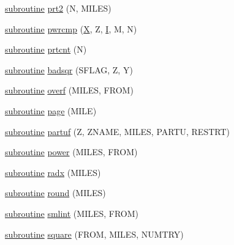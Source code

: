 \begin{DoxyCompactItemize}
\item 
\hyperlink{M__stopwatch_83_8txt_acfbcff50169d691ff02d4a123ed70482}{subroutine} \hyperlink{dparanoia_8f90_adb64903f8562ae9b54e1bc9688d73256}{prt2} (N, M\+I\+L\+ES)
\item 
\hyperlink{M__stopwatch_83_8txt_acfbcff50169d691ff02d4a123ed70482}{subroutine} \hyperlink{dparanoia_8f90_a99ac19051998d16ab21240c6ea92efa9}{pwrcmp} (\hyperlink{intro__blas1_83_8txt_ac8596739bc875e90fe6e2ecf98e87906}{X}, Z, \hyperlink{continue_87_8txt_ae7b8826453d28f1bdb2fba7e889eb23b}{I}, M, N)
\item 
\hyperlink{M__stopwatch_83_8txt_acfbcff50169d691ff02d4a123ed70482}{subroutine} \hyperlink{dparanoia_8f90_a639bf4ff2d08cfba91da58cd02d9ea50}{prtcnt} (N)
\item 
\hyperlink{M__stopwatch_83_8txt_acfbcff50169d691ff02d4a123ed70482}{subroutine} \hyperlink{dparanoia_8f90_a1eaee4863c898f69a37338f52cc223d2}{badsqr} (S\+F\+L\+AG, Z, Y)
\item 
\hyperlink{M__stopwatch_83_8txt_acfbcff50169d691ff02d4a123ed70482}{subroutine} \hyperlink{dparanoia_8f90_afbcfc57adfa91735066899a4f2bc8637}{overf} (M\+I\+L\+ES, F\+R\+OM)
\item 
\hyperlink{M__stopwatch_83_8txt_acfbcff50169d691ff02d4a123ed70482}{subroutine} \hyperlink{dparanoia_8f90_a6586ce42b5da5bd64211632cefda8a76}{page} (M\+I\+LE)
\item 
\hyperlink{M__stopwatch_83_8txt_acfbcff50169d691ff02d4a123ed70482}{subroutine} \hyperlink{dparanoia_8f90_abc9aeab695bb0d80eadb75bba822fee2}{partuf} (Z, Z\+N\+A\+ME, M\+I\+L\+ES, P\+A\+R\+TU, R\+E\+S\+T\+RT)
\item 
\hyperlink{M__stopwatch_83_8txt_acfbcff50169d691ff02d4a123ed70482}{subroutine} \hyperlink{dparanoia_8f90_a908ef801c2dc7c4b54f1a43f007a4dc5}{power} (M\+I\+L\+ES, F\+R\+OM)
\item 
\hyperlink{M__stopwatch_83_8txt_acfbcff50169d691ff02d4a123ed70482}{subroutine} \hyperlink{dparanoia_8f90_ae90ce15b8c2d18156d500ae21387764d}{radx} (M\+I\+L\+ES)
\item 
\hyperlink{M__stopwatch_83_8txt_acfbcff50169d691ff02d4a123ed70482}{subroutine} \hyperlink{dparanoia_8f90_ac9fa3597b76a0e3e3622dee7db0246cd}{round} (M\+I\+L\+ES)
\item 
\hyperlink{M__stopwatch_83_8txt_acfbcff50169d691ff02d4a123ed70482}{subroutine} \hyperlink{dparanoia_8f90_a65decbca56a5900d39f6954e07965116}{smlint} (M\+I\+L\+ES, F\+R\+OM)
\item 
\hyperlink{M__stopwatch_83_8txt_acfbcff50169d691ff02d4a123ed70482}{subroutine} \hyperlink{dparanoia_8f90_a3df535611e179b371692d3389d67f55e}{square} (F\+R\+OM, M\+I\+L\+ES, N\+U\+M\+T\+RY)

\end{DoxyCompactItemize}
